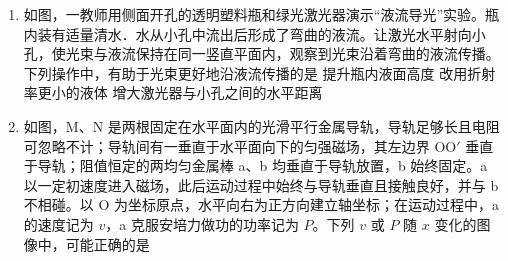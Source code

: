 \documentclass[\gkver]{gaokaozhenti}
\begin{document}
\begin{enumerate}
{A．由图可知，$x = 0$ 处和 $x = 20\Um$ 处的质点都在波峰，相邻两个波峰间的距离等于波长，所以 $\lambda = 20\Um$，A 错误；

B．波速 $v = \frac{\lambda}{T} = \frac{20}{2.5}\Ums = 8\Ums$，B 正确；

C．质点偏离平衡位置的最大距离为 0.25 m，所以振幅为 0.25 m，C 错误；

D．波沿 $x$ 轴正方向传播，沿传播方向看，$x = 8\Um$ 处的质点 P 位于“下坡”上，由“上坡下、下坡上”可知，$t = 0$ 时 P 向 $y$ 轴正方向运动，D 错误。

故选 B。
}

\item
如图，一教师用侧面开孔的透明塑料瓶和绿光激光器演示“液流导光”实验。瓶内装有适量清水．水从小孔中流出后形成了弯曲的液流。让激光水平射向小孔，使光束与液流保持在同一竖直平面内，观察到光束沿着弯曲的液流传播。下列操作中，有助于光束更好地沿液流传播的是
{提升瓶内液面高度}
{改用折射率更小的液体}
{增大激光器与小孔之间的水平距离}

\item
如图，M、N 是两根固定在水平面内的光滑平行金属导轨，导轨足够长且电阻可忽略不计；导轨间有一垂直于水平面向下的匀强磁场，其左边界 OO$'$ 垂直于导轨；阻值恒定的两均匀金属棒 a、b 均垂直于导轨放置，b 始终固定。a 以一定初速度进入磁场，此后运动过程中始终与导轨垂直且接触良好，并与 b 不相碰。以 O 为坐标原点，水平向右为正方向建立轴坐标；在运动过程中，a 的速度记为 $v$，a 克服安培力做功的功率记为 $P$。下列 $v$ 或 $P$ 随 $x$ 变化的图像中，可能正确的是
{}
\end{enumerate}
\end{document}

